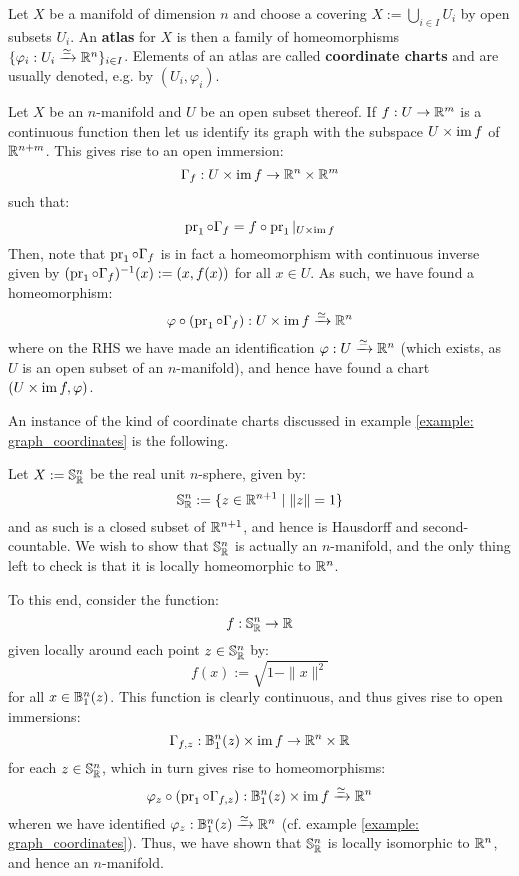         \begin{definition} \label{def: atlases_and_charts}
            Let $X$ be a manifold of dimension $n$ and choose a covering $X := \bigcup_{i \in I} U_i$ by open subsets $U_i$. An \textbf{atlas} for $X$ is then a family of homeomorphisms $\{ \varphi_i: U_i \xrightarrow[]{\simeq} \mathbb{R}^n \}_{i \in I}$. Elements of an atlas are called \textbf{coordinate charts} and are usually denoted, e.g. by $(U_i, \varphi_i)$.
        \end{definition}
        \begin{example} \label{example: graph_coordinates}
            Let $X$ be an $n$-manifold and $U$ be an open subset thereof. If $f: U \to \mathbb{R}^m$ is a continuous function then let us identify its graph with the subspace $U \x \im f$ of $\mathbb{R}^{n + m}$. This gives rise to an open immersion:
                $$\Gamma_f: U \x \im f \to \R^n \x \R^m$$
            such that:
                $$\pr_1 \circ \Gamma_f = f \circ \pr_1|_{U \x \im f}$$
            Then, note that $\operatorname{pr}_1 \circ \Gamma_f$ is in fact a homeomorphism with continuous inverse given by $( \operatorname{pr}_1 \circ \Gamma_f )^{-1}(x) := ( x, f(x) )$ for all $x \in U$. As such, we have found a homeomorphism:
                $$\varphi \circ (\pr_1 \circ \Gamma_f): U \x \im f \xrightarrow[]{\cong} \R^n$$
            where on the RHS we have made an identification $\varphi: U \xrightarrow[]{\simeq} \mathbb{R}^n$ (which exists, as $U$ is an open subset of an $n$-manifold), and hence have found a chart $(U \x \im f, \varphi)$.
        \end{example}
        \begin{example}[Spheres]
            An instance of the kind of coordinate charts discussed in example \ref{example: graph_coordinates} is the following.

            Let $X := \mathbb{S}^n_{\mathbb{R}}$ be the real unit $n$-sphere, given by:
                $$\mathbb{S}^n_{\mathbb{R}} := \{ z \in \mathbb{R}^{n + 1} \mid \|z\| = 1 \}$$
            and as such is a closed subset of $\mathbb{R}^{n + 1}$, and hence is Hausdorff and second-countable. We wish to show that $\mathbb{S}^n_{\mathbb{R}}$ is actually an $n$-manifold, and the only thing left to check is that it is locally homeomorphic to $\mathbb{R}^n$.
            
            To this end, consider the function:
                $$f: \mathbb{S}^n_{\mathbb{R}} \to \mathbb{R}$$
            given locally around each point $z \in \mathbb{S}^n_{\mathbb{R}}$ by:
                $$f(x) := \sqrt{1 - \|x\|^2}$$
            for all $x \in \mathbb{B}^n_1(z)$. This function is clearly continuous, and thus gives rise to open immersions:
                $$\Gamma_{f, z}: \B^n_1(z) \x \im f \to \R^n \x \R$$
            for each $z \in \mathbb{S}^n_{\mathbb{R}}$, which in turn gives rise to homeomorphisms:
                $$\varphi_z \circ (\pr_1 \circ \Gamma_{f, z}): \B^n_1(z) \x \im f \xrightarrow[]{\cong} \R^n$$
            wheren we have identified $\varphi_z: \mathbb{B}^n_1(z) \xrightarrow[]{\simeq} \mathbb{R}^n$ (cf. example \ref{example: graph_coordinates}). Thus, we have shown that $\mathbb{S}^n_{\mathbb{R}}$ is locally isomorphic to $\mathbb{R}^n$, and hence an $n$-manifold.
        \end{example}

